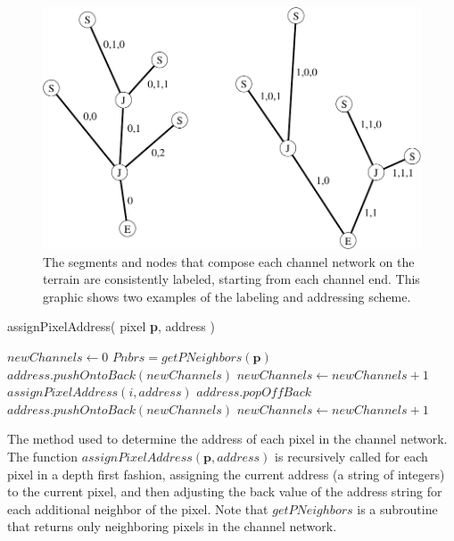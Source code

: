 \begin{figure}[t]
\centering
\begin{minipage}[b]{0.9\linewidth}
\begin{center}
\includegraphics[width=\linewidth]{images/network_diagram.pdf}
\end{center}
\end{minipage}
\caption[Pixel addressing visualization]{\label{figure:addressingScheme}The segments and nodes that compose each channel network on the terrain are consistently labeled, starting from each channel end. This graphic shows two examples of the labeling and addressing scheme.}
\end{figure}

\begin{algorithm}[t]
assignPixelAddress( pixel \textbf{p}, address )
\begin{algorithmic}
  \STATE $newChannels \gets 0$
  \STATE $Pnbrs = getPNeighbors( \textbf{p} )$ 
    \STATE $address.pushOntoBack( newChannels )$
    \STATE $newChannels \gets newChannels + 1$
  \ENDIF
    \STATE $assignPixelAddress( i, address )$
      \STATE $address.popOffBack$
	\STATE $address.pushOntoBack( newChannels )$
	\STATE $newChannels \gets newChannels + 1$	
      \ENDIF
    \ENDIF
  \ENDFOR
\end{algorithmic}
\caption[Pixel addressing algorithm]{\label{algorithm:addressingScheme}The method used to determine the address of each pixel in the channel network. The function $assignPixelAddress(\textbf{p}, address)$ is recursively called for each pixel in a depth first fashion, assigning the current address (a string of integers) to the current pixel, and then adjusting the back value of the address string for each additional neighbor of the pixel. Note that $getPNeighbors$ is a subroutine that returns only neighboring pixels in the channel network.}
\end{algorithm}

